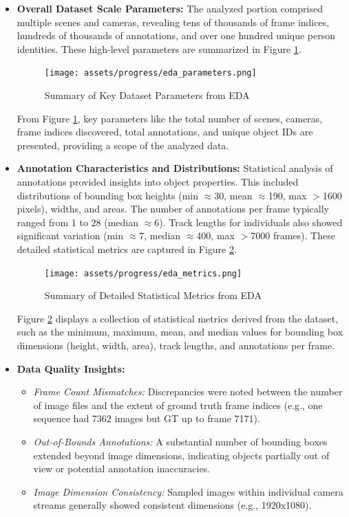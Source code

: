 \begin{itemize}
    \item \textbf{Overall Dataset Scale Parameters:} The analyzed portion comprised multiple scenes and cameras, revealing tens of thousands of frame indices, hundreds of thousands of annotations, and over one hundred unique person identities. These high-level parameters are summarized in Figure \ref{fig:progress_eda_parameters_summary}.

    \begin{figure}[!htb]
        \centering
        \texttt{[image: assets/progress/eda\_parameters.png]}
        \caption{Summary of Key Dataset Parameters from EDA}
        \label{fig:progress_eda_parameters_summary}
    \end{figure}
    
    From Figure \ref{fig:progress_eda_parameters_summary}, key parameters like the total number of scenes, cameras, frame indices discovered, total annotations, and unique object IDs are presented, providing a scope of the analyzed data.

    \item \textbf{Annotation Characteristics and Distributions:} Statistical analysis of annotations provided insights into object properties. This included distributions of bounding box heights (min $\approx$30, mean $\approx$190, max $>$1600 pixels), widths, and areas. The number of annotations per frame typically ranged from 1 to 28 (median $\approx$6). Track lengths for individuals also showed significant variation (min $\approx$7, median $\approx$400, max $>$7000 frames). These detailed statistical metrics are captured in Figure \ref{fig:progress_eda_metrics_summary}.
    \clearpage
    \begin{figure}[!htb]
        \centering
        \texttt{[image: assets/progress/eda\_metrics.png]}
        \caption{Summary of Detailed Statistical Metrics from EDA}
        \label{fig:progress_eda_metrics_summary}
    \end{figure}
    Figure \ref{fig:progress_eda_metrics_summary} displays a collection of statistical metrics derived from the dataset, such as the minimum, maximum, mean, and median values for bounding box dimensions (height, width, area), track lengths, and annotations per frame.
    \clearpage
    \item \textbf{Data Quality Insights:}
        \begin{itemize}
            \item \textit{Frame Count Mismatches:} Discrepancies were noted between the number of image files and the extent of ground truth frame indices (e.g., one sequence had 7362 images but GT up to frame 7171).
            \item \textit{Out-of-Bounds Annotations:} A substantial number of bounding boxes extended beyond image dimensions, indicating objects partially out of view or potential annotation inaccuracies.
            \item \textit{Image Dimension Consistency:} Sampled images within individual camera streams generally showed consistent dimensions (e.g., 1920x1080).
        \end{itemize}


\end{itemize}
